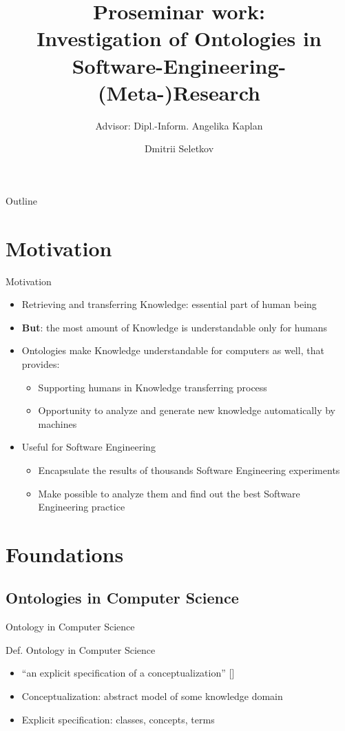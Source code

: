 \documentclass[16:9,en,navbarside]{sdqbeamer}
\title[Investigation of Ontologies in Software-Engineering-(Meta-)Research]{Proseminar work: \\ Investigation of Ontologies in Software-Engineering-(Meta-)Research}
\subtitle{Advisor: Dipl.-Inform. Angelika Kaplan}
\author{Dmitrii Seletkov}
\begin{document}
\KITtitleframe

\begin{frame}{Outline}
\tableofcontents
\end{frame}

\section{Motivation}
\begin{frame}{Motivation}
\begin{itemize}
\item Retrieving and transferring Knowledge: essential part of human being
\pause
\item \textbf{But}: the most amount of Knowledge is understandable only for humans
\pause
\item Ontologies make Knowledge understandable for computers as well, that provides:
    \begin{itemize}
        \item Supporting humans in Knowledge transferring process
        \item Opportunity to analyze and generate new knowledge automatically by machines
    \end{itemize}
\pause
\item Useful for Software Engineering
    \begin{itemize}
        \item Encapsulate the results of thousands Software Engineering experiments
        \item Make possible to analyze them and find out the best Software Engineering practice
    \end{itemize} 
\end{itemize}
\end{frame}

\section{Foundations}
\subsection{Ontologies in Computer Science}
\begin{frame}{Ontology in Computer Science}
\pause
\begin{alertblock}{Def. Ontology in Computer Science}
    \begin{itemize}
        \item \enquote{an explicit specification of a conceptualization} [\cite{Gru93}]
        \item Conceptualization: abstract model of some knowledge domain
        \item Explicit specification: classes, concepts, terms
    \end{itemize}
\end{alertblock}
\end{frame}
\end{document}
